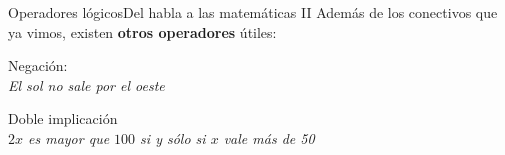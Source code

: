 \documentclass[spanish, c]{beamer}
\begin{document}
\begin{frame}{Operadores lógicos}{Del habla a las matemáticas II}
    Además de los conectivos que ya vimos, existen \textbf{otros operadores} útiles: \pause

    \bigskip

    \begin{description}[<+->]
        \item \alert{Negación}: \\ \textit{El sol no sale por el oeste}
        \item \alert{Doble implicación} \\ \textit{$2x$ es mayor que $100$ si y sólo si $x$ vale más de 50}
    \end{description}

    \bigskip

\end{frame}





\end{document}
